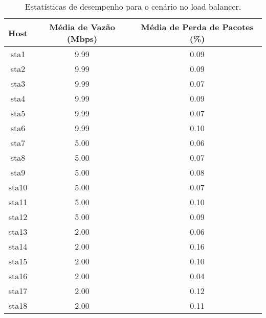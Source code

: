 \begin{table}[htbp]
    \centering
    \label{tab:no_load_balancer_stats}
    \begin{tabular}{|c|c|c|}
        \hline
        \textbf{Host} & \textbf{Média de Vazão (Mbps)} & \textbf{Média de Perda de Pacotes (\%)} \\ \hline
        sta1 & 9.99 & 0.09 \\ \hline
        sta2 & 9.99 & 0.09 \\ \hline
        sta3 & 9.99 & 0.07 \\ \hline
        sta4 & 9.99 & 0.09 \\ \hline
        sta5 & 9.99 & 0.07 \\ \hline
        sta6 & 9.99 & 0.10 \\ \hline
        sta7 & 5.00 & 0.06 \\ \hline
        sta8 & 5.00 & 0.07 \\ \hline
        sta9 & 5.00 & 0.08 \\ \hline
        sta10 & 5.00 & 0.07 \\ \hline
        sta11 & 5.00 & 0.10 \\ \hline
        sta12 & 5.00 & 0.09 \\ \hline
        sta13 & 2.00 & 0.06 \\ \hline
        sta14 & 2.00 & 0.16 \\ \hline
        sta15 & 2.00 & 0.10 \\ \hline
        sta16 & 2.00 & 0.04 \\ \hline
        sta17 & 2.00 & 0.12 \\ \hline
        sta18 & 2.00 & 0.11 \\ \hline

    \end{tabular}
    \caption{Estatísticas de desempenho para o cenário no load balancer.}
\end{table}

